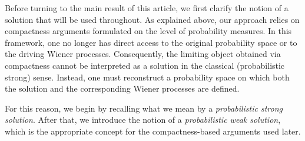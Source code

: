 \documentclass[english,a4paper,11pt]{amsart}
\theoremstyle{plain}
\theoremstyle{definition}
\theoremstyle{remark}
\renewcommand{\emph}[1]{{\sl #1}}
\numberwithin{equation}{section}
\renewcommand{\emph}[1]{{\sl #1}}
\begin{document}
	
	
	Before turning to the main result of this article, we first clarify the notion of 
	a solution that will be used throughout. As explained above, our approach relies 
	on compactness arguments formulated on the level of probability measures. In this 
	framework, one no longer has direct access to the original probability space or 
	to the driving Wiener processes. Consequently, the limiting object obtained via 
	compactness cannot be interpreted as a solution in the classical (probabilistic 
	strong) sense. Instead, one must reconstruct a probability space on which both 
	the solution and the corresponding Wiener processes are defined.
	
	\renewcommand{\emph}[1]{{\sl #1}}
	
	For this reason, we begin by recalling what we mean by a \emph{probabilistic 
		strong solution}. After that, we introduce the notion of a 
	\emph{probabilistic weak solution}, which is the appropriate concept for the 
	compactness-based arguments used later.
	
	
	
\end{document}
